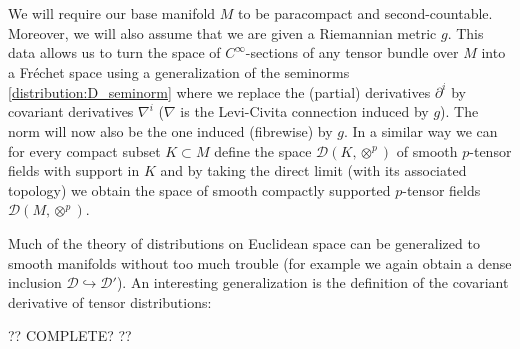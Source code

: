     We will require our base manifold $M$ to be paracompact and second-countable. Moreover, we will also assume that we are given a Riemannian metric $g$. This data allows us to turn the space of $C^\infty$-sections of any tensor bundle over $M$ into a Fr\'echet space using a generalization of the seminorms \ref{distribution:D_seminorm} where we replace the (partial) derivatives $\partial^i$ by covariant derivatives $\nabla^i$ ($\nabla$ is the Levi-Civita connection induced by $g$). The norm will now also be the one induced (fibrewise) by $g$. In a similar way we can for every compact subset $K\subset M$ define the space $\mathcal{D}(K, \otimes^p)$ of smooth $p$-tensor fields with support in $K$ and by taking the direct limit (with its associated topology) we obtain the space of smooth compactly supported $p$-tensor fields $\mathcal{D}(M, \otimes^p)$.


    Much of the theory of distributions on Euclidean space can be generalized to smooth manifolds without too much trouble (for example we again obtain a dense inclusion $\mathcal{D}\hookrightarrow\mathcal{D}'$). An interesting generalization is the definition of the covariant derivative of tensor distributions:

    ?? COMPLETE? ??